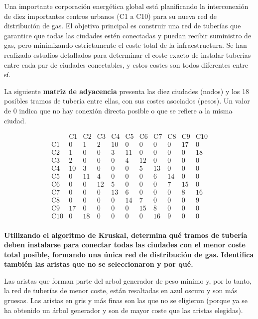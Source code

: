 Una importante corporación energética global está planificando la interconexión de diez importantes centros urbanos (C1 a C10) para su nueva red de distribución de gas. El objetivo principal es construir una red de tuberías que garantice que todas las ciudades estén conectadas y puedan recibir suministro de gas, pero minimizando estrictamente el coste total de la infraestructura. Se han realizado estudios detallados para determinar el coste exacto de instalar tuberías entre cada par de ciudades conectables, y estos costes son todos diferentes entre sí.

La siguiente \textbf{matriz de adyacencia} presenta las diez ciudades (nodos) y los 18 posibles tramos de tubería entre ellas, con sus costes asociados (pesos). Un valor de 0 indica que no hay conexión directa posible o que se refiere a la misma ciudad.

$$
\begin{array}{c|cccccccccc}
& \text{C1} & \text{C2} & \text{C3} & \text{C4} & \text{C5} & \text{C6} & \text{C7} & \text{C8} & \text{C9} & \text{C10} \\
\hline
\text{C1} & 0 & 1 & 2 & 10 & 0 & 0 & 0 & 0 & 17 & 0 \\
\text{C2} & 1 & 0 & 0 & 3 & 11 & 0 & 0 & 0 & 0 & 18 \\
\text{C3} & 2 & 0 & 0 & 0 & 4 & 12 & 0 & 0 & 0 & 0 \\
\text{C4} & 10 & 3 & 0 & 0 & 0 & 5 & 13 & 0 & 0 & 0 \\
\text{C5} & 0 & 11 & 4 & 0 & 0 & 0 & 6 & 14 & 0 & 0 \\
\text{C6} & 0 & 0 & 12 & 5 & 0 & 0 & 0 & 7 & 15 & 0 \\
\text{C7} & 0 & 0 & 0 & 13 & 6 & 0 & 0 & 0 & 8 & 16 \\
\text{C8} & 0 & 0 & 0 & 0 & 14 & 7 & 0 & 0 & 0 & 9 \\
\text{C9} & 17 & 0 & 0 & 0 & 0 & 15 & 8 & 0 & 0 & 0 \\
\text{C10} & 0 & 18 & 0 & 0 & 0 & 0 & 16 & 9 & 0 & 0 \\
\end{array}
$$

\textbf{Utilizando el algoritmo de Kruskal, determina qué tramos de tubería deben instalarse para conectar todas las ciudades con el menor coste total posible, formando una única red de distribución de gas. Identifica también las aristas que no se seleccionaron y por qué.}

Las aristas que forman parte del arbol generador de peso mínimo y, por lo tanto, la red de tuberías de menor coste, están resaltadas en azul oscuro y son más gruesas. Las aristas en gris y más finas son las que no se eligieron (porque ya se ha obtenido un árbol generador y son de mayor coste que las aristas elegidas).

